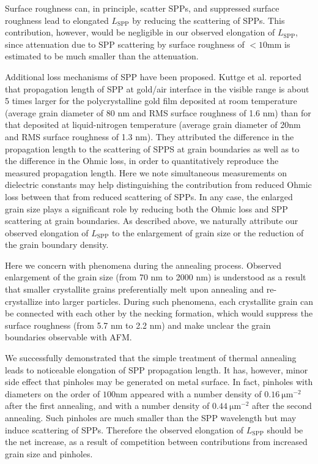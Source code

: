 \documentclass[aip,apl,reprint]{revtex4-1}
\begin{document}
Surface roughness can, in principle, scatter SPPs, and suppressed surface roughness lead to elongated $L_{\mathrm{SPP}}$ by reducing the scattering of SPPs. This contribution, however, would be negligible in our observed elongation of $L_{\mathrm{SPP}}$, since attenuation due to SPP scattering by surface roughness of $<10 \mathrm{mm}$ is estimated to be much smaller than the attenuation.\cite{Shiba, Kuttge, Mills} 

Additional loss mechanisms\cite{Kuttge, Lee} of SPP have been proposed.
Kuttge et al.\cite{Kuttge} reported that propagation length of SPP at gold/air interface in the visible range is about 5 times larger for the polycrystalline gold film deposited at room temperature (average grain diameter of 80 nm and RMS surface roughness of 1.6 nm) than for that deposited at liquid-nitrogen temperature (average grain diameter of 20nm and RMS surface roughness of 1.3 nm).
They attributed the difference in the propagation length to the scattering of SPPS at grain boundaries as well as to the difference in the Ohmic loss, in order to quantitatively reproduce the measured propagation length. 
Here we note simultaneous measurements on dielectric constants may help distinguishing the contribution from reduced Ohmic loss between that from reduced scattering of SPPs. 
In any case, the enlarged grain size plays a significant role by reducing both the Ohmic loss and SPP scattering at grain boundaries.
As described above, we naturally attribute our observed elongation of $L_{\mathrm{SPP}}$ to the enlargement of grain size or the reduction of the grain boundary density.  

Here we concern with phenomena during the annealing process.
Observed enlargement of the grain size (from 70 nm to 2000 nm) is understood as a result that smaller crystallite grains preferentially melt upon annealing\cite{Buffat} and re-crystallize into larger particles. 
 During such phenomena, each crystallite grain can be connected with each other by the necking formation, which would suppress the surface roughness (from 5.7 nm to 2.2 nm) and make unclear the grain boundaries observable with AFM.

We successfully demonstrated that the simple treatment of thermal annealing leads to noticeable elongation of SPP propagation length. It has, however, minor side effect that pinholes may be generated on metal surface. In fact, pinholes with diameters on the order of $100 \mathrm{ nm}$ appeared with a number density of $0.16\:\mathrm{\mu m}^{-2}$ after the first annealing, and with a number density of $0.44\:\mathrm{\mu m}^{-2}$ after the second annealing. Such pinholes are much smaller than the SPP wavelength but may induce scattering of SPPs. Therefore the observed elongation of $L_{\mathrm{SPP}}$ should be the net increase, as a result of competition between contributions from increased grain size and pinholes.
	
\end{document}
